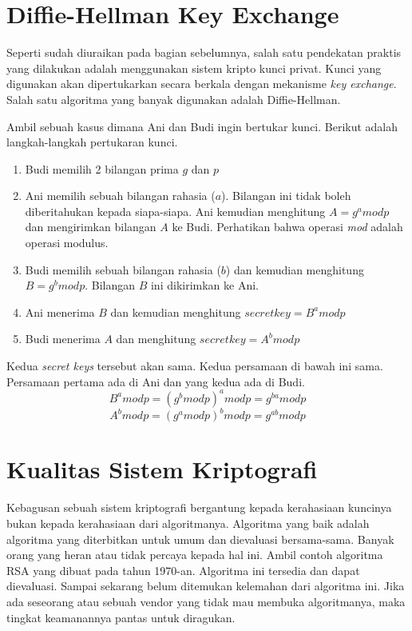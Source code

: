 \section{Diffie-Hellman Key Exchange}
Seperti sudah diuraikan pada bagian sebelumnya, salah satu pendekatan praktis
yang dilakukan adalah menggunakan sistem kripto kunci privat. Kunci yang
digunakan akan dipertukarkan secara berkala dengan mekanisme {\em key
exchange}. Salah satu algoritma yang banyak digunakan adalah Diffie-Hellman.

Ambil sebuah kasus dimana Ani dan Budi ingin bertukar kunci. Berikut adalah
langkah-langkah pertukaran kunci.

\begin{enumerate}
   \item Budi memilih 2 bilangan prima $g$ dan $p$
   \item Ani memilih sebuah bilangan rahasia ($a$). Bilangan ini tidak boleh
      diberitahukan kepada siapa-siapa. Ani kemudian menghitung
      $A = g^{a} mod p$ dan mengirimkan bilangan $A$ ke Budi. Perhatikan bahwa
      operasi {\em mod} adalah operasi modulus.
   \item Budi memilih sebuah bilangan rahasia ($b$) dan kemudian menghitung
      $B = g^{b} mod p$. Bilangan $B$ ini dikirimkan ke Ani.
   \item Ani menerima $B$ dan kemudian menghitung
      $secretkey = B^{a} mod p$
   \item Budi menerima $A$ dan menghitung 
      $secretkey = A^{b} mod p$
\end{enumerate}

Kedua {\em secret keys} tersebut akan sama. Kedua persamaan di bawah ini sama.
Persamaan pertama ada di Ani dan yang kedua ada di Budi.
\begin{equation}
   B^a mod p = (g^b mod p)^a mod p = g^{ba} mod p
\end{equation}
\begin{equation}
   A^b mod p = (g^a mod p)^b mod p = g^{ab} mod p
\end{equation}


\section{Kualitas Sistem Kriptografi}
Kebagusan sebuah sistem kriptografi bergantung kepada kerahasiaan kuncinya
bukan kepada kerahasiaan dari algoritmanya. Algoritma yang baik adalah
algoritma yang diterbitkan untuk umum dan dievaluasi bersama-sama. Banyak orang
yang heran atau tidak percaya kepada hal ini. Ambil contoh algoritma RSA yang
dibuat pada tahun 1970-an. Algoritma ini tersedia dan dapat dievaluasi. Sampai
sekarang belum ditemukan kelemahan dari algoritma ini. Jika ada seseorang atau
sebuah vendor yang tidak mau membuka algoritmanya, maka tingkat keamanannya
pantas untuk diragukan.
